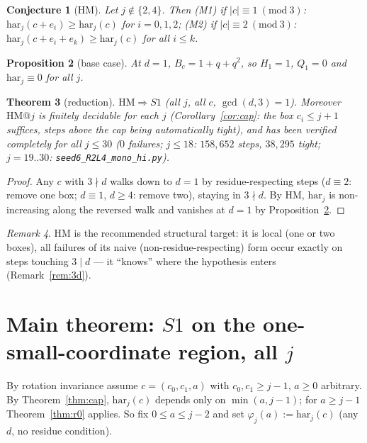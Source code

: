 \documentclass[11pt]{article}
\newtheorem{theorem}{Theorem}[section]
\newtheorem{proposition}[theorem]{Proposition}
\newtheorem{conjecture}[theorem]{Conjecture}
\theoremstyle{definition}
\theoremstyle{remark}
\newtheorem{remark}[theorem]{Remark}
\newcommand{\har}{\mathrm{har}}
\begin{document}
\begin{conjecture}[HM]\label{conj:hm}
Let $j\notin\{2,4\}$. Then
(M1) if $|c|\equiv1\ (\mathrm{mod}\ 3)$: $\har_j(c+e_i)\ge\har_j(c)$ for
$i=0,1,2$;
(M2) if $|c|\equiv2\ (\mathrm{mod}\ 3)$: $\har_j(c+e_i+e_k)\ge\har_j(c)$ for
all $i\le k$.
\end{conjecture}

\begin{proposition}[base case]\label{prop:base}
At $d=1$, $B_c=1+q+q^2$, so $H_1=1$, $Q_1=0$ and $\har_j\equiv0$ for all $j$.
\end{proposition}

\begin{theorem}[reduction]\label{thm:hm}
$\mathrm{HM}\Rightarrow S1$ (all $j$, all $c$, $\gcd(d,3)=1$).
Moreover $\mathrm{HM}@j$ is finitely decidable for each $j$
(Corollary~\ref{cor:cap}: the box $c_i\le j+1$ suffices, steps above the cap
being automatically tight), and has been verified completely for all
$j\le 30$ ($0$ failures; $j\le18$: $158{,}652$ steps, $38{,}295$ tight;
$j=19..30$: \texttt{seed6\_R2L4\_mono\_hi.py}).
\end{theorem}

\begin{proof}
Any $c$ with $3\nmid d$ walks down to $d=1$ by residue-respecting steps
($d\equiv2$: remove one box; $d\equiv1$, $d\ge4$: remove two), staying in
$3\nmid d$. By HM, $\har_j$ is non-increasing along the reversed walk and
vanishes at $d=1$ by Proposition~\ref{prop:base}.
\end{proof}

\begin{remark}
HM is the recommended structural target: it is local (one or two boxes), all
failures of its naive (non-residue-respecting) form occur exactly on steps
touching $3\mid d$ --- it ``knows'' where the hypothesis enters
(Remark~\ref{rem:3d}).
\end{remark}

\section{Main theorem: $S1$ on the one-small-coordinate region, all $j$}
\label{sec:r1}

By rotation invariance assume $c=(c_0,c_1,a)$ with $c_0,c_1\ge j-1$,
$a\ge 0$ arbitrary. By Theorem~\ref{thm:cap}, $\har_j(c)$ depends only on
$\min(a,j-1)$; for $a\ge j-1$ Theorem~\ref{thm:r0} applies. So fix
$0\le a\le j-2$ and set $\varphi_j(a):=\har_j(c)$ (any $d$, no residue
condition).
\end{document}
